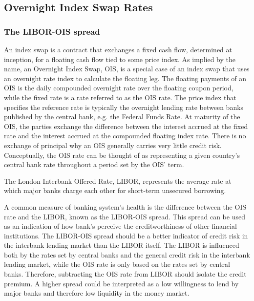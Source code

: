 \documentclass[main.tex]{subfiles}
\begin{document}
    \subsection{Overnight Index Swap Rates}
    
    \subsubsection{The LIBOR-OIS spread}
    An index swap is a contract that exchanges a fixed cash flow, determined at inception,
    for a floating cash flow tied to some price index.
    As implied by the name, an Overnight Index Swap, OIS, is a special case of an index swap
    that uses an overnight rate index to calculate the floating leg.
    The floating payments of an OIS is the daily compounded overnight rate 
    over the floating coupon period,
    while the fixed rate is a rate referred to as the OIS rate.
    The price index that specifies the reference rate is typically the overnight 
    lending rate between banks published by the central bank, e.g. the Federal Funds Rate.
    At maturity of the OIS, the parties exchange the difference between the interest accrued 
    at the fixed rate and the interest accrued at the compounded floating index rate.
    There is no exchange of principal why an OIS generally carries very little credit risk. 
    Conceptually, the OIS rate can be thought of as representing a given country's
    central bank rate throughout a period set by the OIS' term. 

    The London Interbank Offered Rate, LIBOR, represents the average rate 
    at which major banks charge each other for short-term unsecured borrowing.

    A common measure of banking system's health is the difference between the OIS rate
    and the LIBOR, known as the LIBOR-OIS spread.
    This spread can be used as an indication of how bank's perceive the creditworthiness
    of other financial institutions. 
    The LIBOR-OIS spread should be a better indicator of credit risk in the interbank lending market
    than the LIBOR itself. 
    The LIBOR is influenced both by the rates set by central banks and 
    the general credit risk in the interbank lending market,
    while the OIS rate is only based on the rates set by central banks.
    Therefore, subtracting the OIS rate from LIBOR should isolate the credit premium.
    A higher spread could be interpreted as a low willingness to lend by major banks
    and therefore low liquidity in the money market.
\end{document}
